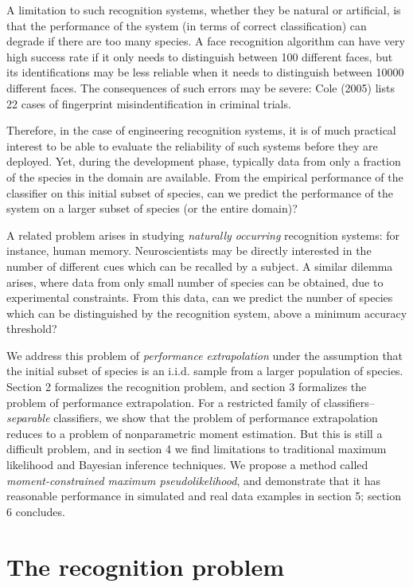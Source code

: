\documentclass{article}
\begin{document}
A limitation to such recognition systems, whether they be natural or
artificial, is that the performance of the system (in terms of correct
classification) can degrade if there are too many species.  A face
recognition algorithm can have very high success rate if it only needs
to distinguish between 100 different faces, but its identifications
may be less reliable when it needs to distinguish between 10000
different faces.  The consequences of such errors may be severe: Cole
(2005) lists 22 cases of fingerprint misindentification in criminal
trials.

Therefore, in the case of engineering recognition systems, it is of
much practical interest to be able to evaluate the reliability of such
systems before they are deployed.  Yet, during the development phase,
typically data from only a fraction of the species in the domain are
available.  From the empirical performance of the classifier on this
initial subset of species, can we predict the performance of the
system on a larger subset of species (or the entire domain)?

A related problem arises in studying \emph{naturally occurring}
recognition systems: for instance, human memory.  Neuroscientists may
be directly interested in the number of different cues which can be
recalled by a subject.  A similar dilemma arises, where data from only
small number of species can be obtained, due to experimental
constraints.  From this data, can we predict the number of species
which can be distinguished by the recognition system, above a minimum
accuracy threshold?

We address this problem of \emph{performance extrapolation} under the
assumption that the initial subset of species is an i.i.d. sample from
a larger population of species.  Section 2 formalizes the recognition problem, and section 3
formalizes the problem of performance extrapolation.  For a restricted family of
classifiers--\emph{separable} classifiers, we show that the problem
of performance extrapolation reduces to a problem of nonparametric
moment estimation.  But this is still a difficult problem, and in
section 4 we find limitations to traditional maximum likelihood and
Bayesian inference techniques.  
We propose a method called \emph{moment-constrained maximum pseudolikelihood},
and demonstrate that it has reasonable performance in simulated and real data examples
in section 5;  section 6 concludes.


\section{The recognition problem}
\end{document}
